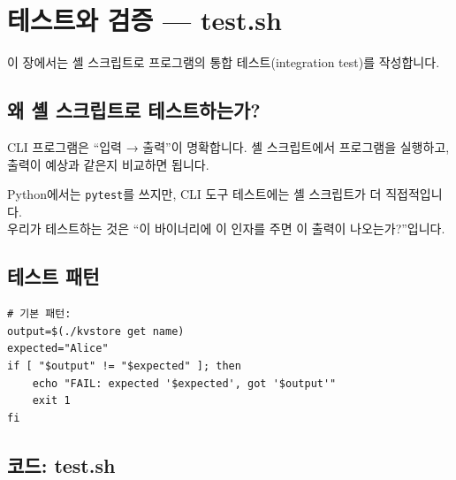 \documentclass[11pt,a4paper]{book}
\newcommand{\code}[1]{\texttt{#1}}
\begin{document}
\chapter{테스트와 검증 — test.sh}
\label{ch:test}

이 장에서는 셸 스크립트로 프로그램의 통합 테스트(integration test)를 작성합니다.

\section{왜 셸 스크립트로 테스트하는가?}

CLI 프로그램은 ``입력 → 출력''이 명확합니다. 셸 스크립트에서 프로그램을 실행하고, 출력이 예상과 같은지 비교하면 됩니다.

\begin{pythonbox}
Python에서는 \code{pytest}를 쓰지만, CLI 도구 테스트에는 셸 스크립트가 더 직접적입니다.\\
우리가 테스트하는 것은 ``이 바이너리에 이 인자를 주면 이 출력이 나오는가?''입니다.
\end{pythonbox}

\section{테스트 패턴}

\begin{lstlisting}[style=shell,numbers=none]
# 기본 패턴:
output=$(./kvstore get name)
expected="Alice"
if [ "$output" != "$expected" ]; then
    echo "FAIL: expected '$expected', got '$output'"
    exit 1
fi
\end{lstlisting}

\section{코드: test.sh}
\end{document}
